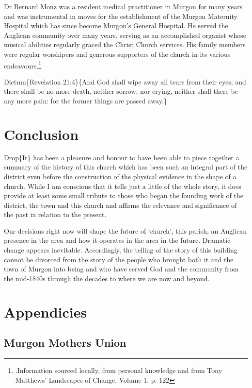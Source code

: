 Dr Bernard Monz was a resident medical practitioner in Murgon for many years and was instrumental in moves for the establishment of the Murgon Maternity Hospital which has since become Murgon's General Hospital. He served the Anglican community over many years, serving as an accomplished organist whose musical abilities regularly graced the Christ Church services. His family members were regular worshipers and generous supporters of the church in its various endeavours.\footnote{.Information sourced locally, from personal knowledge and from Tony Matthews' Landscapes of Change, Volume 1, p. 122}

Dictum\{Revelation 21:4\}\{And God shall wipe away all tears from their eyes; and there shall be no more death, neither sorrow, nor crying, neither shall there be any more pain: for the former things are passed away.\}

\hypertarget{conclusion}{%
\chapter{Conclusion}\label{conclusion}}

Drop\{It\} has been a pleasure and honour to have been able to piece together a summary of the history of this church which has been such an integral part of the district even before the construction of the physical evidence in the shape of a church. While I am conscious that it tells just a little of the whole story, it does provide at least some small tribute to those who began the founding work of the district, the town and this church and affirms the relevance and significance of the past in relation to the present.

Our decisions right now will shape the future of `church', this parish, an Anglican presence in the area and how it operates in the area in the future. Dramatic change appears inevitable. Accordingly, the telling of the story of this building cannot be divorced from the story of the people who brought both it and the town of Murgon into being and who have served God and the community from the mid-1840s through the decades to where we are now and beyond.

\hypertarget{appendicies}{%
\chapter{Appendicies}\label{appendicies}}

\hypertarget{murgon-mothers-union}{%
\section{Murgon Mothers Union}\label{murgon-mothers-union}}

